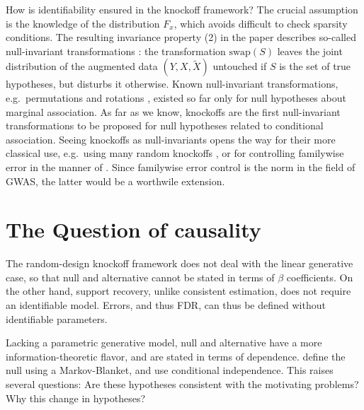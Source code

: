 \documentclass[article,lineno]{biometrika}
\begin{document}
How is identifiability ensured in the knockoff framework?
The crucial assumption is the knowledge of the distribution $F_x$, which avoids difficult to check sparsity conditions. 
The resulting invariance property (2) in the paper describes so-called null-invariant transformations \citep{Goeman2010}: the transformation $\textrm{swap}(S)$ leaves the joint distribution of the augmented data $(Y,X,\tilde X)$ untouched if $S$ is the set of true hypotheses, but disturbs it otherwise.
Known null-invariant transformations, e.g.\ permutations and rotations \citep{Langsrud2005}, existed so far only for null hypotheses about marginal association.
As far as we know, knockoffs are the first null-invariant transformations to be proposed for null hypotheses related to conditional association.
Seeing knockoffs as null-invariants opens the way for their more classical use, e.g.\ using many random knockoffs \citep{Hemerik2018}, or for controlling familywise error in the manner of \cite{Westfall1993}.
Since familywise error control is the norm in the field of GWAS, the latter would be a worthwile extension.


\section{The Question of causality}

The random-design knockoff framework does not deal with the linear generative case, so that null and alternative cannot be stated in terms of $\beta$ coefficients.
On the other hand, support recovery, unlike consistent estimation, does not require an identifiable model.
Errors, and thus FDR, can thus be defined without identifiable parameters.

Lacking a parametric generative model, null and alternative have a more information-theoretic flavor, and are stated in terms of dependence.
\citet{CandesPanninggoldmodelX2018} define the null using a Markov-Blanket, and \cite{SesiaGenehuntinghidden} use conditional independence.
This raises several questions:
Are these hypotheses consistent with the motivating problems?
Why this change in hypotheses?
\end{document}
